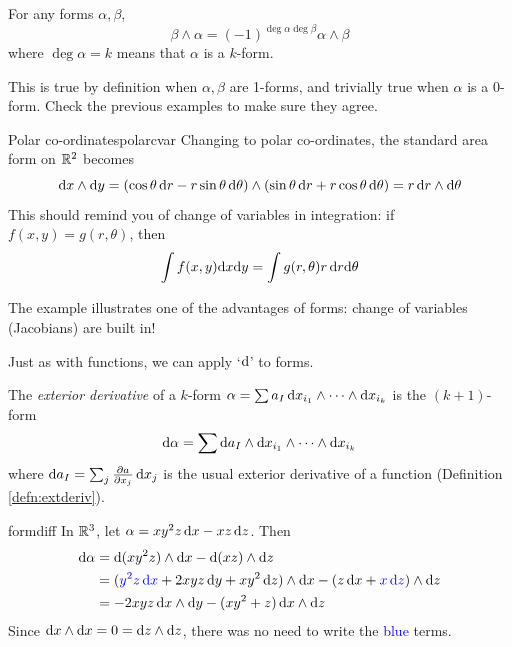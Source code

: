 \begin{lemm}{}{}
	For any forms $\alpha,\beta$,
	\[
		\beta\wedge\alpha=(-1)^{\deg\alpha\deg\beta}\alpha\wedge\beta
	\]
	where $\deg\alpha=k$ means that $\alpha$ is a $k$-form.
\end{lemm}


This is true by definition when $\alpha,\beta$ are 1-forms, and trivially true when $\alpha$ is a 0-form. Check the previous examples to make sure they agree.


\begin{example}{Polar co-ordinates}{polarcvar}
	Changing to polar co-ordinates, the standard area form on $\R^2$ becomes
	\[
		\dx\wedge\dy =(\cos\theta\,\dr-r\sin\theta\,\dth)\wedge (\sin\theta\,\dr+r\cos\theta\,\dth)=r\,\dr\wedge\dth
	\]
	This should remind you of change of variables in integration: if $f(x,y)=g(r,\theta)$, then
	\[
		\int f(x,y)\dx\dy=\int g(r,\theta)r\,\dr\dth
	\]
\end{example}

The example illustrates one of the advantages of forms: change of variables (Jacobians) are built in! %



Just as with functions, we can apply `$\D$' to forms.

\begin{defn}{}{}
	The \emph{exterior derivative} of a $k$-form $\alpha=\sum a_I\,\dx_{i_1}\wedge\cdots\wedge\dx_{i_k}$ is the $(k+1)$-form
	\[
		\D\alpha=\sum \D a_I\wedge\dx_{i_1}\wedge\cdots\wedge\dx_{i_k}
	\]
	where $\D a_I=\sum_j \partials[a]{x_j}\,\dx_j$ is the usual exterior derivative of a function (Definition \ref{defn:extderiv}).
\end{defn}

\begin{example}{}{formdiff}
	In $\R^3$, let $\alpha=xy^2z\,\dx-xz\,\dz$. Then
	\begin{align*}
		\D\alpha&=\D(xy^2z)\wedge\dx-\D(xz)\wedge\dz\\
		&=(\textcolor{blue}{y^2z\,\dx}+2xyz\,\dy+xy^2\,\dz)\wedge\dx -(z\,\dx+\textcolor{blue}{x\,\dz})\wedge\dz\\
		&=-2xyz\,\dx\wedge\dy -(xy^2+z)\,\dx\wedge\dz
	\end{align*}
	Since $\dx\wedge\dx=0=\dz\wedge\dz$, there was no need to write the \textcolor{blue}{blue} terms.
\end{example}


